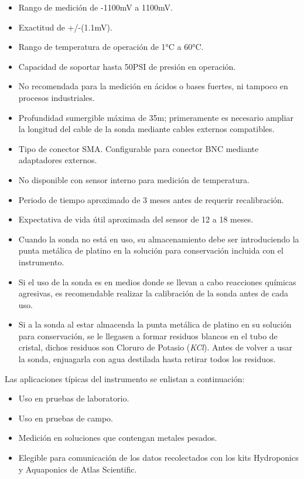 \begin{itemize}
    \item Rango de medición de -1100mV a 1100mV.
    \item Exactitud de +/-(1.1mV).
    \item Rango de temperatura de operación de 1°C a 60°C.
    \item Capacidad de soportar hasta 50PSI de presión en operación.
    \item No recomendada para la medición en ácidos o bases fuertes, ni tampoco en procesos industriales. 
    \item Profundidad sumergible máxima de 35m; primeramente es necesario ampliar la longitud del cable de la sonda mediante cables externos compatibles.
    \item Tipo de conector SMA. Configurable para conector BNC mediante adaptadores externos.
    \item No disponible con sensor interno para medición de temperatura.
    \item Periodo de tiempo aproximado de 3 meses antes de requerir recalibración.
    \item Expectativa de vida útil aproximada del sensor de 12 a 18 meses.
    \item Cuando la sonda no está en uso, su almacenamiento debe ser introduciendo la punta metálica de platino en la solución para conservación incluida con el instrumento.
    \item Si el uso de la sonda es en medios donde se llevan a cabo reacciones químicas agresivas, es recomendable realizar la calibración de la sonda antes de cada uso.
    \item Si a la sonda al estar almacenda la punta metálica de platino en su solución para conservación, se le llegasen a formar residuos blancos en el tubo de cristal, dichos residuos son Cloruro de Potasio (\textit{KCl}). Antes de 
    volver a usar la sonda, enjuagarla con agua destilada hasta retirar todos los residuos. 
\end{itemize}

Las aplicaciones típicas del instrumento se enlistan a continuación:

\begin{itemize}
    \item Uso en pruebas de laboratorio.
    \item Uso en pruebas de campo.
    \item Medición en soluciones que contengan metales pesados.
    \item Elegible para comunicación de los datos recolectados con los kits Hydroponics y Aquaponics de Atlas Scientific.
\end{itemize}

